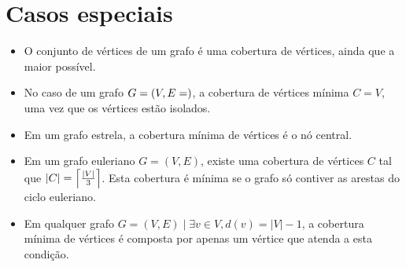 \section{Casos especiais}
\label{sec:casos-especiais}

\begin{itemize}
    \item O conjunto de vértices de um grafo é uma cobertura de
    vértices, ainda que a maior possível.

    \item No caso de um grafo $G = (V, E=\empty)$, a cobertura de vértices
    mínima $C = V$, uma vez que os vértices estão isolados.

    \item Em um grafo estrela, a cobertura mínima de vértices é o nó
    central.

    \item Em um grafo euleriano $G = (V, E)$,  existe uma cobertura de
    vértices $C$ tal que $\left| C \right| = \left \lceil {\left| V \right|
        \over 3} \right \rceil$. Esta cobertura é mínima se o grafo só
        contiver as arestas do ciclo euleriano.

    \item Em qualquer grafo $G = (V, E) \mid \exists v \in V, d(v) =
    \left| V \right| - 1$, a cobertura mínima de vértices é composta
    por apenas um vértice que atenda a esta condição.
\end{itemize}
